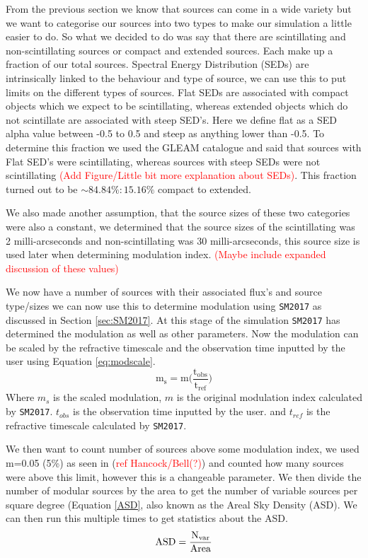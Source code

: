 \documentclass[a4paper, 10pt]{article}
\begin{document}
From the previous section we know that sources can come in a wide variety but we want to categorise our sources into two types to make our simulation a little easier to do. So what we decided to do was say that there are scintillating and non-scintillating sources or compact and extended sources. Each make up a fraction of our total sources. Spectral Energy Distribution (SEDs) are intrinsically linked to the behaviour and type of source, we can use this to put limits on the different types of sources. Flat SEDs are associated with compact objects which we expect to be scintillating, whereas extended objects which do not scintillate are associated with steep SED's. Here we define flat as a SED alpha value between -0.5 to 0.5 and steep as anything lower than -0.5. To determine this fraction we used the GLEAM catalogue \citep{Gleam} and said that sources with Flat SED's were scintillating, whereas sources with steep SEDs were not scintillating \textcolor{red}{(Add Figure/Little bit more explanation about SEDs)}. This fraction turned out to be $\sim 84.84\%:15.16\%$ compact to extended.

We also made another assumption, that the source sizes of these two categories were also a constant, we determined that the source sizes of the scintillating was 2 milli-arcseconds and non-scintillating was 30 milli-arcseconds, this source size is used later when determining modulation index. \textcolor{red}{(Maybe include expanded discussion of these values)}

We now have a number of sources with their associated flux's and source type/sizes we can now use this to determine modulation using \texttt{SM2017} as discussed in Section \ref{sec:SM2017}. At this stage of the simulation \texttt{\texttt{SM2017}} has determined the modulation as well as other parameters. Now the modulation can be scaled by the refractive timescale and the observation time inputted by the user using Equation \ref{eq:modscale}.
\begin{equation}\label{eq:modscale}\mathrm{ 
m_{s}=m\bigg(\dfrac{t_{obs}}{t_{ref}}\bigg)
}\end{equation}
Where $m_s$ is the scaled modulation, $m$ is the original modulation index calculated by \texttt{\texttt{SM2017}}. $t_{obs}$ is the observation time inputted by the user. and $t_{ref}$ is the refractive timescale calculated by \texttt{\texttt{SM2017}}.
 
We then want to count number of sources above some modulation index, we used m=0.05 (5\%) as seen in (\textcolor{red}{ref Hancock/Bell(?)}) and counted how many sources were above this limit, however this is a changeable parameter. We then divide the number of modular sources by the area to get the number of variable sources per square degree (Equation \ref{ASD}, also known as the Areal Sky Density (ASD). We can then run this multiple times to get statistics about the ASD.\\
\begin{equation}\mathrm{\label{ASD}
    ASD=\dfrac{N_{var}}{Area}
}\end{equation}
\end{document}
